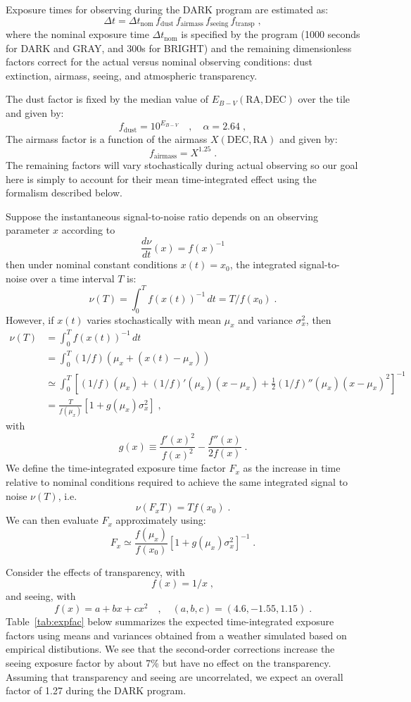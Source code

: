 \documentclass[12pt]{article}
\providecommand{\tab}[1]{Table~\ref{tab:#1}}
\begin{document}
Exposure times for observing during the DARK program are estimated as:
$$
\Delta t = \Delta t_{\text{nom}}\, f_{\text{dust}}\, f_{\text{airmass}}\,
f_{\text{seeing}}\, f_{\text{transp}} \; ,
$$
where the nominal exposure time $\Delta t_{\text{nom}}$ is specified by the program (1000 seconds for DARK and GRAY, and 300s for BRIGHT) and the remaining dimensionless factors correct for the actual versus nominal observing conditions: dust extinction, airmass, seeing, and atmospheric transparency.

The dust factor is fixed by the median value of $E_{B-V}(\text{RA}, \text{DEC})$ over the tile and given by:
$$
f_{\text{dust}} = 10^{E_{B-V}}
\quad, \quad \alpha = 2.64 \; ,
$$
The airmass factor is a function of the airmass $X(\text{DEC}, \text{RA})$ and given by:
$$
f_{\text{airmass}} = X^{1.25} \; .
$$
The remaining factors will vary stochastically during actual observing so our goal here is simply to account for their mean time-integrated effect using the formalism described below.

Suppose the instantaneous signal-to-noise ratio depends on an observing parameter $x$ according to
$$
\frac{d\nu}{dt}(x) = f(x)^{-1}
$$
then under nominal constant conditions $x(t) = x_0$, the integrated signal-to-noise over a time interval $T$ is:
$$
\nu(T) = \int_0^T f(x(t))^{-1}\, dt =  T / f(x_0) \; .
$$
However, if $x(t)$ varies stochastically with mean $\mu_x$ and variance $\sigma_x^2$, then
\begin{align}
\nu(T) &= \int_0^T f(x(t))^{-1}\, dt \\
&= \int_0^T (1/f)\left(
\mu_x + (x(t) - \mu_x)\right) \\
&\simeq \int_0^T \left[ (1/f)(\mu_x) + (1/f)'(\mu_x) (x - \mu_x)
+ \frac{1}{2} (1/f)''(\mu_x) (x - \mu_x)^2 \right]^{-1} \\
&= \frac{T}{f(\mu_x)}\left[1 + g(\mu_x) \sigma_x^2 \right] \; ,
\end{align}
with
$$
g(x) \equiv \frac{f'(x)^2}{f(x)^2} - \frac{f''(x)}{2 f(x)} \; .
$$
We define the time-integrated exposure time factor $F_x$ as the increase in time relative to nominal conditions required to achieve the same integrated signal to noise $\nu(T)$, i.e.
$$
\nu(F_x T) = T f(x_0) \; .
$$
We can then evaluate $F_x$ approximately using:
$$
F_x \simeq \frac{f(\mu_x)}{f(x_0)} \left[1 +
g(\mu_x) \sigma_x^2 \right]^{-1} \; .
$$

Consider the effects of transparency, with
$$
f(x) = 1/x \; ,
$$
and seeing, with
$$
f(x) = a + b x + c x^2 \quad , \quad (a,b,c) = (4.6, -1.55, 1.15) \; .
$$
\tab{expfac} below summarizes the expected time-integrated exposure factors using means and variances obtained from a weather simulated based on empirical distibutions. We see that the second-order corrections increase the seeing exposure factor by about 7\% but have no effect on the transparency. Assuming that transparency and seeing are uncorrelated, we expect an overall factor of 1.27 during the DARK program.
\end{document}
